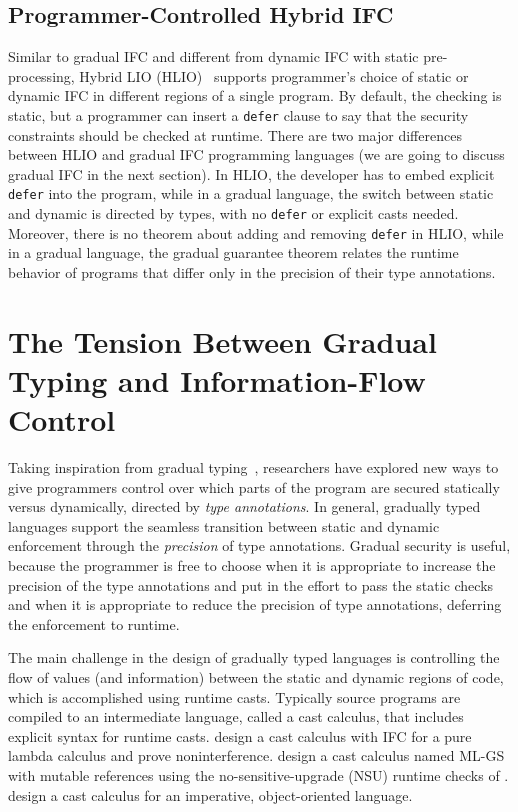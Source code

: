 \subsection{Programmer-Controlled Hybrid IFC}
\label{sec:intro-hybrid}

Similar to gradual IFC and different from dynamic IFC with static
pre-processing, Hybrid LIO (HLIO)~\cite{Buiras:2015aa} supports programmer's
choice of static or dynamic IFC in different regions of a single program. By
default, the checking is static, but a programmer can insert a \texttt{defer}
clause to say that the security constraints should be checked at runtime. There
are two major differences between HLIO and gradual IFC programming languages (we
are going to discuss gradual IFC in the next section). In HLIO, the developer
has to embed explicit \texttt{defer} into the program, while in a gradual
language, the switch between static and dynamic is directed by types, with no
\texttt{defer} or explicit casts needed. Moreover, there is no theorem about
adding and removing \texttt{defer} in HLIO, while in a gradual language, the
gradual guarantee theorem relates the runtime behavior of programs that differ
only in the precision of their type annotations.

\section{The Tension Between Gradual Typing and Information-Flow Control}
\label{sec:intro-gradual-ifc}

Taking inspiration from gradual typing~\parencite{Siek:2006bh,Siek:2007qy},
researchers have explored new ways to give programmers control over which parts
of the program are secured statically versus dynamically, directed by
\textit{type annotations}. In general, gradually typed languages support the
seamless transition between static and dynamic enforcement through the
\textit{precision} of type annotations. Gradual security is useful, because the
programmer is free to choose when it is appropriate to increase the precision of
the type annotations and put in the effort to pass the static checks and when it
is appropriate to reduce the precision of type annotations, deferring the
enforcement to runtime.

The main challenge in the design of gradually typed languages is controlling the
flow of values (and information) between the static and dynamic regions of code,
which is accomplished using runtime casts. Typically source programs are
compiled to an intermediate language, called a cast calculus, that includes
explicit syntax for runtime casts. \textcite{Disney:2011fv} design a cast
calculus with IFC for a pure lambda calculus and prove noninterference.
\textcite{Fennell:2013ab} design a cast calculus named ML-GS with mutable
references using the no-sensitive-upgrade (NSU) runtime checks of
\textcite{austin2009efficient}. \textcite{Fennell:2015aa} design a cast calculus
for an imperative, object-oriented language.

